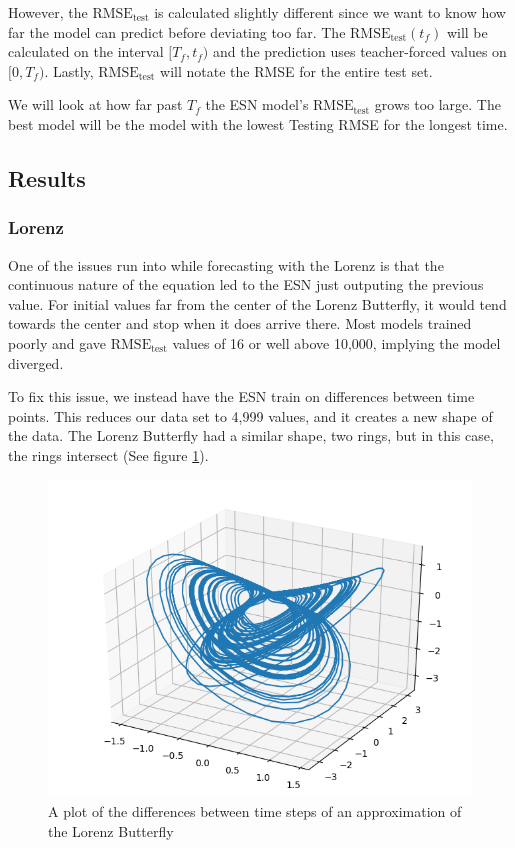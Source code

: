 \documentclass{article}
\begin{document}
However, the $\text{RMSE}_\text{test}$ is calculated slightly different
since we want to know how far the model can predict before deviating too
far. The $\text{RMSE}_\text{test}(t_f)$ will be calculated on the interval
$[T_f, t_f)$ and the prediction uses teacher-forced values on $[0, T_f)$.
Lastly, $\text{RMSE}_\text{test}$ will notate the RMSE for the entire test
set.

We will look at how far past $T_f$ the ESN model's
$\text{RMSE}_\text{test}$ grows too large. The best model will be the 
model with the lowest Testing RMSE for the longest time.

\subsection{Results}
\subsubsection{Lorenz}

One of the issues run into while forecasting with the Lorenz is that the
continuous nature of the equation led to the ESN just outputing the
previous value. For initial values far from the center of the Lorenz
Butterfly, it would tend towards the center and stop when it does arrive
there. Most models trained poorly and gave $\text{RMSE}_\text{test}$
values of 16 or well above 10,000, implying the model diverged.

To fix this issue, we instead have the ESN train on differences between
time points. This reduces our data set to 4,999 values, and it creates
a new shape of the data. The Lorenz Butterfly had a similar shape, two rings, but in this case, the rings intersect (See figure \ref{fig:lorenz_diff}).

\begin{figure}[H]
    \centering
    \includegraphics[width=.5\linewidth]{doc/paper/images/lorenz/full_differential.png}
    \caption{A plot of the differences between time steps of an approximation of the Lorenz Butterfly}
    \label{fig:lorenz_diff}
\end{figure}
\end{document}
